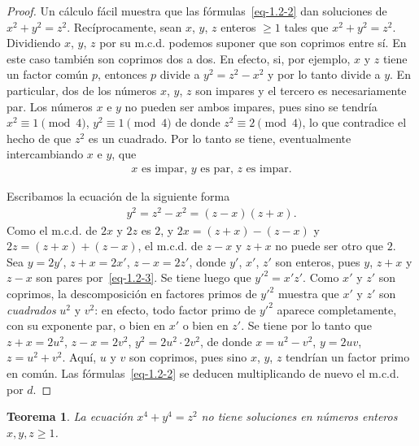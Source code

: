 \documentclass[oneside,bibtotoc,leqno,spanish]{amsbook}
\newcommand{\QED}{}%
\numberwithin{equation}{section}
\theoremstyle{defi}
\theoremstyle{note}
\newtheorem{theorem}{Teorema}
\theoremstyle{rem}
\numberwithin{theorem}{section}
\numberwithin{proposition}{section}
\numberwithin{definition}{section}
\numberwithin{lemma}{section}
\numberwithin{corollary}{section}
\numberwithin{example}{section}
\numberwithin{footnote}{section}%
\begin{document}
\begin{proof}
Un c\'alculo f\'acil muestra que las f\'ormulas~\eqref{eq-1.2-2} dan soluciones
de $x^{2}+y^{2}=z^{2}$.
Rec\'iprocamente, sean $x$, $y$, $z$ enteros $\geq 1$ tales que $x^{2}+y^{2}=z^{2}$. Dividiendo
$x$, $y$, $z$ por su m.c.d. podemos suponer que son coprimos entre s\'i. En este caso tambi\'en
son coprimos dos a dos. En efecto, si, por ejemplo, $x$ y $z$ tiene un factor com\'un $p$, entonces
$p$ divide a $y^{2} = z^{2}-x^{2}$ y por lo tanto divide a $y$. En particular, dos de
los n\'umeros
$x$, $y$, $z$ son impares y el tercero es necesariamente par. Los n\'umeros $x$ e $y$ no
pueden ser ambos impares, pues sino se tendr\'ia $x^{2}\equiv 1\pmod 4$, $y^{2}\equiv 1\pmod 4$
de donde $z^{2}\equiv 2\pmod 4$, lo que contradice el hecho de que $z^{2}$ es un cuadrado.
Por lo tanto se tiene, eventualmente intercambiando $x$ e $y$, que
\begin{gather}\label{eq-1.2-3}
\text{$x$ es impar, $y$ es par, $z$ es impar.}
\end{gather}

Escribamos la ecuaci\'on de la siguiente forma
\begin{gather}\label{eq-1.2-4}
y^{2} = z^{2}-x^{2} = (z-x)(z+x).
\end{gather}
Como el m.c.d. de $2x$ y $2z$ es $2$, y $2x = (z+x)-(z-x)$ y $2z = (z+x)+(z-x)$, el
m.c.d. de $z-x$ y $z+x$ no puede ser otro que $2$. Sea $y = 2y'$, $z+x = 2x'$,
$z-x = 2z'$, donde $y'$, $x'$, $z'$ son enteros, pues $y$, $z+x$ y $z-x$ son pares
por~\eqref{eq-1.2-3}. Se tiene luego que $y'^{2} = x'z'$. Como $x'$ y $z'$ son coprimos, la descomposici\'on
en factores primos de $y'^{2}$ muestra que $x'$ y $z'$ son {\em cuadrados} $u^{2}$ y $v^{2}$:
en efecto, todo factor primo de $y'^{2}$ aparece completamente, con su exponente par,
o bien en $x'$ o bien en $z'$. Se tiene por lo tanto que $z+x = 2u^{2}$, $z-x = 2v^{2}$,
$y^{2} = 2u^{2}\cdot 2v^{2}$, de donde $x = u^{2}-v^{2}$, $y=2uv$, $z=u^{2}+v^{2}$. Aqu\'i,
$u$ y $v$ son coprimos, pues sino $x$, $y$, $z$ tendr\'ian un factor primo en com\'un. Las
f\'ormulas~\eqref{eq-1.2-2} se deducen multiplicando de nuevo el m.c.d. por $d$. %
\end{proof}

\begin{theorem}\label{teo2.2.2}
La ecuaci\'on $x^{4}+y^{4}=z^{2}$ no tiene soluciones en n\'umeros enteros $x, y, z \geq 1$.
\end{theorem}
\end{document}
